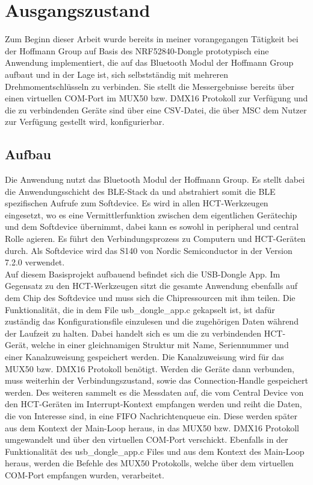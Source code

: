 \section{Ausgangszustand}
Zum Beginn dieser Arbeit wurde bereits in meiner vorangegangen Tätigkeit bei der Hoffmann Group auf Basis des NRF52840-Dongle prototypisch eine Anwendung implementiert, die auf das Bluetooth Modul der Hoffmann Group aufbaut und in der Lage ist, sich selbstständig mit mehreren Drehmomentschlüsseln zu verbinden. Sie stellt die Messergebnisse bereits über einen virtuellen COM-Port im MUX50 bzw. DMX16 Protokoll zur Verfügung und die zu verbindenden Geräte sind über eine \ac{CSV}-Datei, die über \ac{MSC} dem Nutzer zur Verfügung gestellt wird, konfigurierbar.

\subsection{Aufbau}
Die Anwendung nutzt das Bluetooth Modul der Hoffmann Group. Es stellt dabei die Anwendungsschicht des \ac{BLE}-Stack da und abstrahiert somit die \ac{BLE} spezifischen Aufrufe zum Softdevice. Es wird in allen \ac{HCT}-Werkzeugen eingesetzt, wo es eine Vermittlerfunktion zwischen dem eigentlichen Gerätechip und dem Softdevice übernimmt, dabei kann es sowohl in peripheral und central Rolle agieren. Es führt den Verbindungsprozess zu Computern und \ac{HCT}-Geräten durch. Als Softdevice wird das S140 von Nordic Semiconductor in der Version 7.2.0 verwendet. \\
Auf diesem Basisprojekt aufbauend befindet sich die \ac{USB}-Dongle App. Im Gegensatz zu den \ac{HCT}-Werkzeugen sitzt die gesamte Anwendung ebenfalls auf dem Chip des Softdevice und muss sich die Chipressourcen mit ihm teilen. Die Funktionalität, die in dem File usb\_dongle\_app.c gekapselt ist, ist dafür zuständig das Konfigurationsfile einzulesen und die zugehörigen Daten während der Laufzeit zu halten. Dabei handelt sich es um die zu verbindenden \ac{HCT}-Gerät, welche in einer gleichnamigen Struktur mit Name, Seriennummer und einer Kanalzuweisung gespeichert werden. Die Kanalzuweisung wird für das MUX50 bzw. DMX16 Protokoll benötigt. Werden die Geräte dann verbunden, muss weiterhin der Verbindungszustand, sowie das Connection-Handle gespeichert werden. Des weiteren sammelt es die Messdaten auf, die vom Central Device von den \ac{HCT}-Geräten im Interrupt-Kontext empfangen werden und reiht die Daten, die von Interesse sind, in eine \ac{FIFO} Nachrichtenqueue ein. Diese werden später aus dem Kontext der Main-Loop heraus, in das MUX50 bzw. DMX16 Protokoll umgewandelt und über den virtuellen COM-Port verschickt. Ebenfalls in der Funktionalität des usb\_dongle\_app.c Files und aus dem Kontext des Main-Loop heraus, werden die Befehle des MUX50 Protokolls, welche über dem virtuellen COM-Port empfangen wurden, verarbeitet.\\
